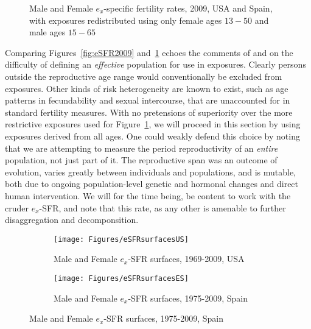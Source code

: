 \begin{figure}[ht!]
        \centering  
          \caption{Male and Female $e_x$-specific fertility rates, 2009, USA and
          Spain, with exposures redistributed using only female ages $13-50$ and
          male ages $15-65$}
          \label{fig:eSFR2009limits}
\end{figure}

Comparing Figures~\ref{fig:eSFR2009} and~\ref{fig:eSFR2009limits} echoes the
comments of \citet{gupta1978alternative} and \citet{mitra1976effect} on the difficulty of
defining an \textit{effective} population for use in exposures. Clearly persons
outside the reproductive age range would conventionally be excluded from
exposures. Other kinds of risk heterogeneity are known to exist, such as age
patterns in fecundability and sexual intercourse, that are unaccounted for in
standard fertility measures. With no pretensions of superiority over the more
restrictive exposures used for Figure~\ref{fig:eSFR2009limits}, we will proceed
in this section by using exposures derived from all ages. One could weakly
defend this choice by noting that we are attempting to measure the period
reproductivity of an \textit{entire} population, not just part of it. The
reproductive span was an outcome of evolution, varies greatly between
individuals and populations, and is mutable, both due to ongoing
population-level genetic and hormonal changes and direct human intervention. We
will for the time being, be content to work with the cruder $e_x$-SFR, and note
that this rate, as any other is amenable to further disaggregation and
decomponsition.

\begin{figure}
        \centering
        \begin{subfigure}
                \centering
                \caption{Male and Female $e_x$-SFR surfaces, 1969-2009, USA}
                \texttt{[image: Figures/eSFRsurfacesUS]}
                \label{fig:exSFRsurfUS}
        \end{subfigure}
        \begin{subfigure}
                \centering
                \caption{Male and Female $e_x$-SFR surfaces, 1975-2009, Spain}
                \texttt{[image: Figures/eSFRsurfacesES]} 
                \label{fig:exSFRsurfES}
        \end{subfigure}
\end{figure}

